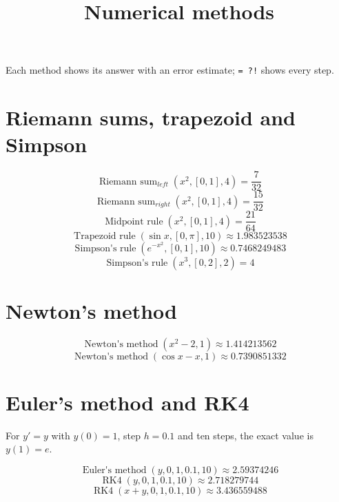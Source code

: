 \documentclass[11pt,a4paper]{article}
\title{Numerical methods}
\date{}
\theoremstyle{plain}
\theoremstyle{definition}
\theoremstyle{remark}
\begin{document}
\maketitle
Each method shows its answer with an error estimate; \texttt{= ?!} shows every step.

\section*{Riemann sums, trapezoid and Simpson}

\begin{equation*}
  \operatorname{Riemann\ sum}_{left}(x^2, [0, 1], 4) = \frac{7}{32}
\end{equation*}
\begin{equation*}
  \operatorname{Riemann\ sum}_{right}(x^2, [0, 1], 4) = \frac{15}{32}
\end{equation*}
\begin{equation*}
  \operatorname{Midpoint\ rule}(x^2, [0, 1], 4) = \frac{21}{64}
\end{equation*}
\begin{equation*}
  \operatorname{Trapezoid\ rule}(\sin x, [0, \pi], 10) \approx 1.983523538
\end{equation*}
\begin{equation*}
  \operatorname{Simpson's\ rule}(e^{-x^2}, [0, 1], 10) \approx 0.7468249483
\end{equation*}
\begin{equation*}
  \operatorname{Simpson's\ rule}(x^3, [0, 2], 2) = 4
\end{equation*}
\section*{Newton's method}

\begin{equation*}
  \operatorname{Newton's\ method}(x^2 - 2, 1) \approx 1.414213562
\end{equation*}
\begin{equation*}
  \operatorname{Newton's\ method}(\cos x - x, 1) \approx 0.7390851332
\end{equation*}
\section*{Euler's method and RK4}

For $y' = y$ with $y(0) = 1$, step $h = 0.1$ and ten steps, the exact value is $y(1) = e$.

\begin{equation*}
  \operatorname{Euler's\ method}(y, 0, 1, 0.1, 10) \approx 2.59374246
\end{equation*}
\begin{equation*}
  \operatorname{RK4}(y, 0, 1, 0.1, 10) \approx 2.718279744
\end{equation*}
\begin{equation*}
  \operatorname{RK4}(x + y, 0, 1, 0.1, 10) \approx 3.436559488
\end{equation*}
\end{document}

